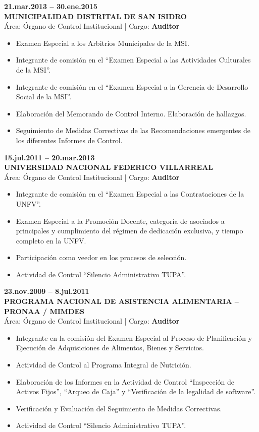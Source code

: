 \documentclass[11pt,a4paper]{article}
\begin{document}
\noindent
\textbf{21.mar.2013 -- 30.ene.2015}\\
\textbf{MUNICIPALIDAD DISTRITAL DE SAN ISIDRO}\\
\'Area: \'Organo de Control Institucional \quad | \quad Cargo: \textbf{Auditor}
\begin{itemize}
\item Examen Especial a los Arbitrios Municipales de la MSI.
\item Integrante de comisi\'on en el ``Examen Especial a las Actividades Culturales de la MSI''.
\item Integrante de comisi\'on en el ``Examen Especial a la Gerencia de Desarrollo Social de la MSI''.
\item Elaboraci\'on del Memorando de Control Interno. Elaboraci\'on de hallazgos.
\item Seguimiento de Medidas Correctivas de las Recomendaciones emergentes de los diferentes Informes de Control.
\end{itemize}

\noindent
\textbf{15.jul.2011 -- 20.mar.2013}\\
\textbf{UNIVERSIDAD NACIONAL FEDERICO VILLARREAL}\\
\'Area: \'Organo de Control Institucional \quad | \quad Cargo: \textbf{Auditor}
\begin{itemize}
\item Integrante de comisi\'on en el ``Examen Especial a las Contrataciones de la UNFV''.
\item Examen Especial a la Promoci\'on Docente, categor\'ia de asociados a principales y cumplimiento del r\'egimen de dedicaci\'on exclusiva, y tiempo completo en la UNFV.
\item Participaci\'on como veedor en los procesos de selecci\'on.
\item Actividad de Control ``Silencio Administrativo TUPA''.
\end{itemize}

\noindent
\textbf{23.nov.2009 -- 8.jul.2011}\\
\textbf{PROGRAMA NACIONAL DE ASISTENCIA ALIMENTARIA -- PRONAA / MIMDES}\\
\'Area: \'Organo de Control Institucional \quad | \quad Cargo: \textbf{Auditor}
\begin{itemize}
\item Integrante en la comisi\'on del Examen Especial al Proceso de Planificaci\'on y Ejecuci\'on de Adquisiciones de Alimentos, Bienes y Servicios.
\item Actividad de Control al Programa Integral de Nutrici\'on.
\item Elaboraci\'on de los Informes en la Actividad de Control ``Inspecci\'on de Activos Fijos'', ``Arqueo de Caja'' y ``Verificaci\'on de la legalidad de software''.
\item Verificaci\'on y Evaluaci\'on del Seguimiento de Medidas Correctivas.
\item Actividad de Control ``Silencio Administrativo TUPA''.
\end{itemize}
\end{document}

